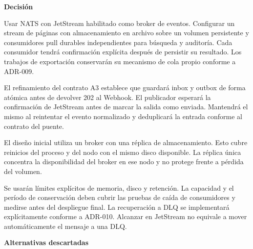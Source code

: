 \par\medskip\noindent\textbf{Decisión}\par\nobreak\smallskip

Usar NATS con JetStream habilitado como broker de eventos. Configurar un stream de páginas con almacenamiento en archivo sobre un volumen persistente y consumidores pull durables independientes para búsqueda y auditoría. Cada consumidor tendrá confirmación explícita después de persistir su resultado. Los trabajos de exportación conservarán su mecanismo de cola propio conforme a ADR-009.

El refinamiento del contrato A3 establece que  guardará inbox y outbox de forma atómica antes de devolver 202 al Webhook. El publicador esperará la confirmación de JetStream antes de marcar la salida como enviada. Mantendrá el mismo  al reintentar el evento normalizado y deduplicará la entrada conforme al contrato del puente.

El diseño inicial utiliza un broker con una réplica de almacenamiento. Esto cubre reinicios del proceso y del nodo con el mismo disco disponible. La réplica única concentra la disponibilidad del broker en ese nodo y no protege frente a pérdida del volumen.

Se usarán límites explícitos de memoria, disco y retención. La capacidad y el período de conservación deben cubrir las pruebas de caída de consumidores y medirse antes del despliegue final. La recuperación a DLQ se implementará explícitamente conforme a ADR-010. Alcanzar  en JetStream no equivale a mover automáticamente el mensaje a una DLQ.

\par\medskip\noindent\textbf{Alternativas descartadas}\par\nobreak\smallskip

